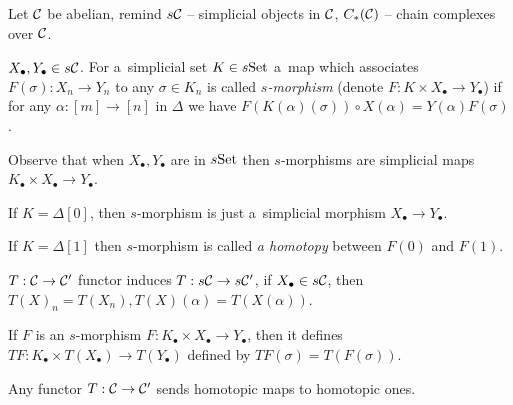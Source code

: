 



    Let $\mathcal{C}$ be abelian,
    remind $s\mathcal{C}$ -- simplicial objects in $\mathcal{C}$,
    $C_\ast(\mathcal{C})$ -- chain complexes over $\mathcal{C}$.
    
    \begin{definition}[$s$-morphism]
        $X_\bullet, Y_\bullet \in s\mathcal{C}$. For a~simplicial set $K \in s\mathrm{Set}$
        a~map which associates $F(\sigma):X_n \to Y_n$
        to any $\sigma \in K_n$ is called {\em $s$-morphism}
        (denote $F:K \times X_\bullet \to Y_\bullet$)
        if for any $\alpha:[m]\to[n]$ in $\Delta$ we have
        $F(K(\alpha)(\sigma)) \circ X(\alpha) = Y(\alpha) F(\sigma)$.
        
        Observe that when $X_\bullet, Y_\bullet$ are in $s\mathrm{Set}$ then
        $s$-morphisms are simplicial maps 
        $K_\bullet \times X_\bullet \to Y_\bullet$.
    \end{definition}
    
    \begin{example}
        If $K=\Delta[0]$, then $s$-morphism 
        is just a~simplicial morphism $X_\bullet \to Y_\bullet$.
    \end{example}
    
    \begin{example}
        If $K=\Delta[1]$ then $s$-morphism is called
        {\em a homotopy} between $F(0)$ and $F(1)$.
    \end{example}
    
    \begin{remark}
        $T:\mathcal{C} \to \mathcal{C}'$ functor
        induces $T:s\mathcal{C} \to s\mathcal{C}'$, 
        if $X_\bullet \in s\mathcal{C}$, then
        \\$T(X)_n = T(X_n), T(X)(\alpha) = T(X(\alpha))$.
    \end{remark}
    
    \begin{definition}
        If $F$ is an $s$-morphism 
        $F:K_\bullet \times X_\bullet \to Y_\bullet$,
        then it defines 
        $TF:K_\bullet \times T(X_\bullet) \to T(Y_\bullet)$
        defined by $TF(\sigma) = T(F(\sigma))$.
    \end{definition}
    
    \begin{remark}
        Any functor $T:\mathcal{C} \to \mathcal{C}'$ sends homotopic maps
        to homotopic ones.
    \end{remark}

